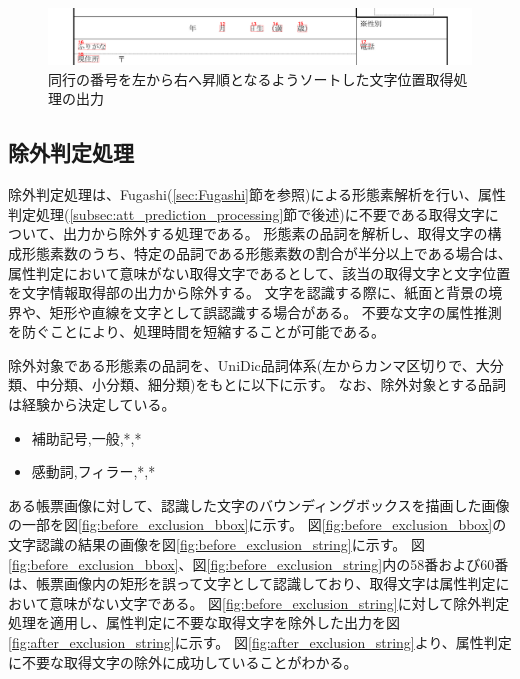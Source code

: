 \begin{figure}[t]
    \begin{center}
        \includegraphics[width=15cm]{image/04-implementation/after_sorted_string.png}
        \caption{同行の番号を左から右へ昇順となるようソートした文字位置取得処理の出力}
        \label{fig:after_sorted_string}
    \end{center}
\end{figure}


\subsection{除外判定処理}\label{subsec:exclusion_judgement_processing}
除外判定処理は、Fugashi(\ref{sec:Fugashi}節を参照)による形態素解析を行い、属性判定処理(\ref{subsec:att_prediction_processing}節で後述)に不要である取得文字について、出力から除外する処理である。
形態素の品詞を解析し、取得文字の構成形態素数のうち、特定の品詞である形態素数の割合が半分以上である場合は、属性判定において意味がない取得文字であるとして、該当の取得文字と文字位置を文字情報取得部の出力から除外する。
文字を認識する際に、紙面と背景の境界や、矩形や直線を文字として誤認識する場合がある。
不要な文字の属性推測を防ぐことにより、処理時間を短縮することが可能である。

除外対象である形態素の品詞を、UniDic品詞体系(左からカンマ区切りで、大分類、中分類、小分類、細分類)をもとに以下に示す。
なお、除外対象とする品詞は経験から決定している。

\begin{itemize}
    \item 補助記号,一般,*,*
    \item 感動詞,フィラー,*,*
\end{itemize}

ある帳票画像に対して、認識した文字のバウンディングボックスを描画した画像の一部を図\ref{fig:before_exclusion_bbox}に示す。
図\ref{fig:before_exclusion_bbox}の文字認識の結果の画像を図\ref{fig:before_exclusion_string}に示す。
図\ref{fig:before_exclusion_bbox}、図\ref{fig:before_exclusion_string}内の58番および60番は、帳票画像内の矩形を誤って文字として認識しており、取得文字は属性判定において意味がない文字である。
図\ref{fig:before_exclusion_string}に対して除外判定処理を適用し、属性判定に不要な取得文字を除外した出力を図\ref{fig:after_exclusion_string}に示す。
図\ref{fig:after_exclusion_string}より、属性判定に不要な取得文字の除外に成功していることがわかる。

